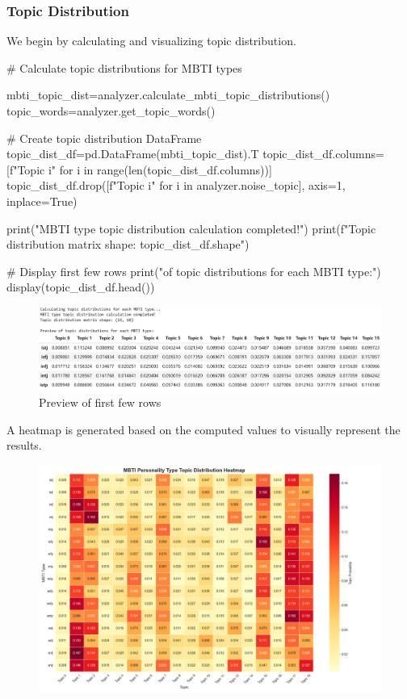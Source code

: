 \documentclass[12pt]{article}
\numberwithin{figure}{section}  %
\begin{document}
	\subsubsection{Topic Distribution}
	We begin by calculating and visualizing topic distribution.
	\begin{python}
# Calculate topic distributions for MBTI types

mbti_topic_dist=analyzer.calculate_mbti_topic_distributions()
topic_words=analyzer.get_topic_words()

# Create topic distribution DataFrame
topic_dist_df=pd.DataFrame(mbti_topic_dist).T
topic_dist_df.columns=[f"Topic {i}" for i in range(len(topic_dist_df.columns))]
topic_dist_df.drop([f"Topic {i}" for i in analyzer.noise_topic],
                   axis=1,
                   inplace=True)

print("MBTI type topic distribution calculation completed!")
print(f"Topic distribution matrix shape: {topic_dist_df.shape}")

# Display first few rows
print("\nPreview of topic distributions for each MBTI type:")
display(topic_dist_df.head())
	\end{python}
	\begin{figure}[H]
		\centering
		\includegraphics[width=1\textwidth]{Q2row} 
		\caption{\centering Preview of first few rows}		
	\end{figure}
	
	A heatmap is generated based on the computed values to visually represent the results.
	\begin{figure}[H]
		\centering
		\includegraphics[width=1\textwidth]{Q2hmap} 	
	\end{figure}
	
\end{document}
